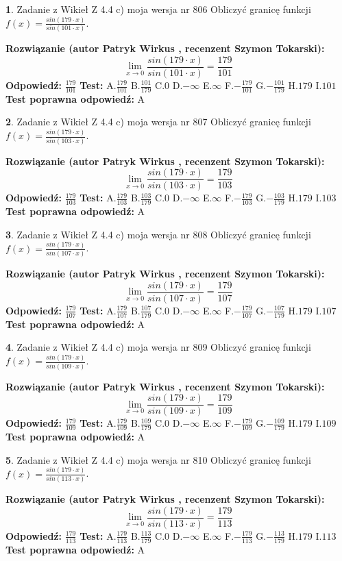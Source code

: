 \documentclass[12pt, a4paper]{article}
\theoremstyle{definition} %
\newtheorem{zad}{}
\newcommand{\zadStart}[1]{\begin{zad}#1\newline}
\newcommand{\zadStop}{\end{zad}}
\newcommand{\rozwStart}[2]{\noindent \textbf{Rozwiązanie (autor #1 , recenzent #2): }\newline}
\newcommand{\rozwStop}{\newline}
\newcommand{\odpStart}{\noindent \textbf{Odpowiedź:}\newline}
\newcommand{\odpStop}{\newline}
\newcommand{\testStart}{\noindent \textbf{Test:}\newline}
\newcommand{\testStop}{\newline}
\newcommand{\kluczStart}{\noindent \textbf{Test poprawna odpowiedź:}\newline}
\newcommand{\kluczStop}{\newline}
\begin{document}
\zadStart{Zadanie z Wikieł Z 4.4 c) moja wersja nr 806}
Obliczyć granicę funkcji $f(x)=\frac{sin(179\cdot x)}{sin(101\cdot x)}$.
\zadStop
\rozwStart{Patryk Wirkus}{Szymon Tokarski}
$$\lim\limits_{x\to 0}\frac{sin(179\cdot x)}{sin(101\cdot x)}=
\frac{179}{101}$$
\rozwStop
\odpStart
$\frac{179}{101}$
\odpStop
\testStart
A.$\frac{179}{101}$
B.$\frac{101}{179}$
C.$0$
D.$-\infty$
E.$\infty$
F.$-\frac{179}{101}$
G.$-\frac{101}{179}$
H.$179$
I.$101$
\testStop
\kluczStart
A
\kluczStop



\zadStart{Zadanie z Wikieł Z 4.4 c) moja wersja nr 807}
Obliczyć granicę funkcji $f(x)=\frac{sin(179\cdot x)}{sin(103\cdot x)}$.
\zadStop
\rozwStart{Patryk Wirkus}{Szymon Tokarski}
$$\lim\limits_{x\to 0}\frac{sin(179\cdot x)}{sin(103\cdot x)}=
\frac{179}{103}$$
\rozwStop
\odpStart
$\frac{179}{103}$
\odpStop
\testStart
A.$\frac{179}{103}$
B.$\frac{103}{179}$
C.$0$
D.$-\infty$
E.$\infty$
F.$-\frac{179}{103}$
G.$-\frac{103}{179}$
H.$179$
I.$103$
\testStop
\kluczStart
A
\kluczStop



\zadStart{Zadanie z Wikieł Z 4.4 c) moja wersja nr 808}
Obliczyć granicę funkcji $f(x)=\frac{sin(179\cdot x)}{sin(107\cdot x)}$.
\zadStop
\rozwStart{Patryk Wirkus}{Szymon Tokarski}
$$\lim\limits_{x\to 0}\frac{sin(179\cdot x)}{sin(107\cdot x)}=
\frac{179}{107}$$
\rozwStop
\odpStart
$\frac{179}{107}$
\odpStop
\testStart
A.$\frac{179}{107}$
B.$\frac{107}{179}$
C.$0$
D.$-\infty$
E.$\infty$
F.$-\frac{179}{107}$
G.$-\frac{107}{179}$
H.$179$
I.$107$
\testStop
\kluczStart
A
\kluczStop



\zadStart{Zadanie z Wikieł Z 4.4 c) moja wersja nr 809}
Obliczyć granicę funkcji $f(x)=\frac{sin(179\cdot x)}{sin(109\cdot x)}$.
\zadStop
\rozwStart{Patryk Wirkus}{Szymon Tokarski}
$$\lim\limits_{x\to 0}\frac{sin(179\cdot x)}{sin(109\cdot x)}=
\frac{179}{109}$$
\rozwStop
\odpStart
$\frac{179}{109}$
\odpStop
\testStart
A.$\frac{179}{109}$
B.$\frac{109}{179}$
C.$0$
D.$-\infty$
E.$\infty$
F.$-\frac{179}{109}$
G.$-\frac{109}{179}$
H.$179$
I.$109$
\testStop
\kluczStart
A
\kluczStop



\zadStart{Zadanie z Wikieł Z 4.4 c) moja wersja nr 810}
Obliczyć granicę funkcji $f(x)=\frac{sin(179\cdot x)}{sin(113\cdot x)}$.
\zadStop
\rozwStart{Patryk Wirkus}{Szymon Tokarski}
$$\lim\limits_{x\to 0}\frac{sin(179\cdot x)}{sin(113\cdot x)}=
\frac{179}{113}$$
\rozwStop
\odpStart
$\frac{179}{113}$
\odpStop
\testStart
A.$\frac{179}{113}$
B.$\frac{113}{179}$
C.$0$
D.$-\infty$
E.$\infty$
F.$-\frac{179}{113}$
G.$-\frac{113}{179}$
H.$179$
I.$113$
\testStop
\kluczStart
A
\kluczStop
\end{document}
